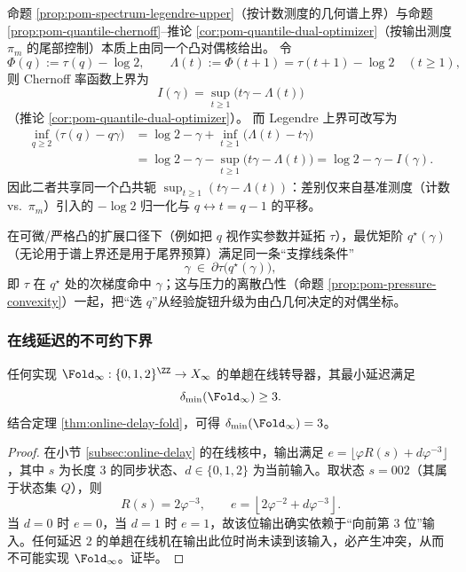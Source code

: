 \begin{remark}\label{rem:pom-legendre-chernoff-same-dual}
命题 \ref{prop:pom-spectrum-legendre-upper}（按计数测度的几何谱上界）与命题 \ref{prop:pom-quantile-chernoff}--推论 \ref{cor:pom-quantile-dual-optimizer}（按输出测度 \(\pi_m\) 的尾部控制）本质上由同一个凸对偶核给出。
令
\[
\Phi(q):=\tau(q)-\log 2,
\qquad
\Lambda(t):=\Phi(t+1)=\tau(t+1)-\log 2\quad(t\ge 1),
\]
则 Chernoff 率函数上界为
\[
I(\gamma)=\sup_{t\ge 1}\bigl(t\gamma-\Lambda(t)\bigr)
\]
（推论 \ref{cor:pom-quantile-dual-optimizer}）。
而 Legendre 上界可改写为
\[
\begin{aligned}
\inf_{q\ge 2}\bigl(\tau(q)-q\gamma\bigr)
&=\log 2-\gamma+\inf_{t\ge 1}\bigl(\Lambda(t)-t\gamma\bigr)\\
&=\log 2-\gamma-\sup_{t\ge 1}\bigl(t\gamma-\Lambda(t)\bigr)
=\log 2-\gamma-I(\gamma).
\end{aligned}
\]
因此二者共享同一个凸共轭 \(\sup_{t\ge 1}(t\gamma-\Lambda(t))\)：差别仅来自基准测度（计数 vs.\ \(\pi_m\)）引入的 \(-\log 2\) 归一化与 \(q\leftrightarrow t=q-1\) 的平移。
\par
在可微/严格凸的扩展口径下（例如把 \(q\) 视作实参数并延拓 \(\tau\)），最优矩阶 \(q^\star(\gamma)\)（无论用于谱上界还是用于尾界预算）满足同一条“支撑线条件”
\[
\gamma\ \in\ \partial \tau\bigl(q^\star(\gamma)\bigr),
\]
即 \(\tau\) 在 \(q^\star\) 处的次梯度命中 \(\gamma\)；这与压力的离散凸性（命题 \ref{prop:pom-pressure-convexity}）一起，把“选 \(q\)”从经验旋钮升级为由凸几何决定的对偶坐标。
\end{remark}

\subsubsection{在线延迟的不可约下界}\label{subsec:pom-delay-lb}
\begin{proposition}\label{prop:pom-delay-min}
任何实现 $\Fold_\infty:\{0,1,2\}^{\ZZ}\to X_\infty$ 的单趟在线转导器，其最小延迟满足
\[
\delta_{\min}(\Fold_\infty)\ge 3.
\]
结合定理 \ref{thm:online-delay-fold}，可得 $\delta_{\min}(\Fold_\infty)=3$。
\end{proposition}
\begin{proof}
在小节 \ref{subsec:online-delay} 的在线核中，输出满足
\(
e=\lfloor \varphi R(s)+d\varphi^{-3}\rfloor
\)，其中 $s$ 为长度 $3$ 的同步状态、$d\in\{0,1,2\}$ 为当前输入。取状态 $s=002$（其属于状态集 $Q$），则
\[
R(s)=2\varphi^{-3},\qquad
e=\left\lfloor 2\varphi^{-2}+d\varphi^{-3}\right\rfloor.
\]
当 $d=0$ 时 $e=0$，当 $d=1$ 时 $e=1$，故该位输出确实依赖于“向前第 $3$ 位”输入。任何延迟 $2$ 的单趟在线机在输出此位时尚未读到该输入，必产生冲突，从而不可能实现 $\Fold_\infty$。证毕。
\end{proof}

